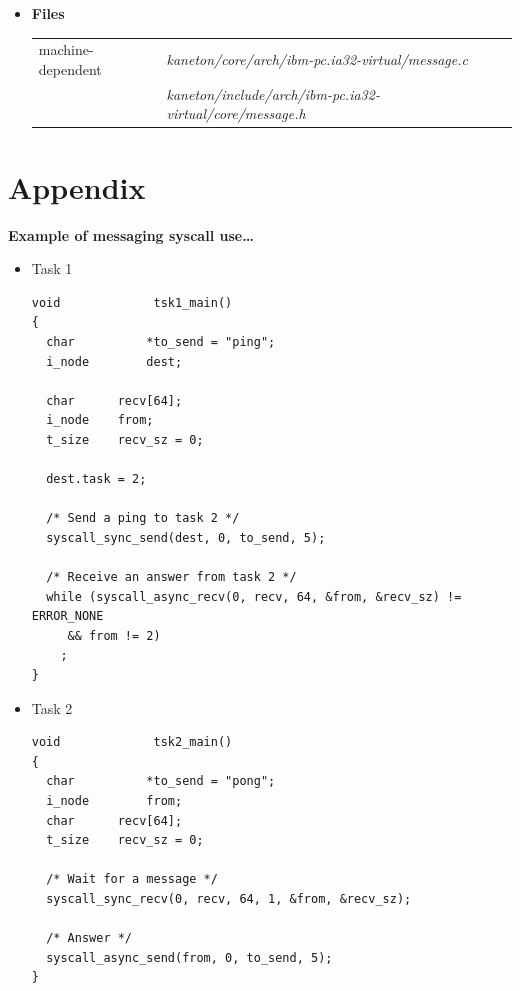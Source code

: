 \begin{itemize}
  \item {\bf {Files}}\\

    \begin{tabular}{| l | l |}
      \hline
      machine-dependent & {\em kaneton/core/arch/ibm-pc.ia32-virtual/message.c}\\
      & {\em kaneton/include/arch/ibm-pc.ia32-virtual/core/message.h}\\\hline
    \end{tabular}

\end{itemize}

%
%

\newpage

\section{Appendix}

\textbf{Example of messaging syscall use\ldots}

\begin{itemize}
  \item Task 1

\begin{verbatim}
void             tsk1_main()
{
  char          *to_send = "ping";
  i_node        dest;
  
  char		recv[64];
  i_node	from;
  t_size	recv_sz = 0;

  dest.task = 2;

  /* Send a ping to task 2 */
  syscall_sync_send(dest, 0, to_send, 5);

  /* Receive an answer from task 2 */
  while (syscall_async_recv(0, recv, 64, &from, &recv_sz) != ERROR_NONE
	 && from != 2)
    ;
}
\end{verbatim}

  \item Task 2

\begin{verbatim}
void             tsk2_main()
{
  char          *to_send = "pong";
  i_node        from;
  char		recv[64];
  t_size	recv_sz = 0;

  /* Wait for a message */
  syscall_sync_recv(0, recv, 64, 1, &from, &recv_sz);

  /* Answer */
  syscall_async_send(from, 0, to_send, 5);
}
\end{verbatim}

\end{itemize}

